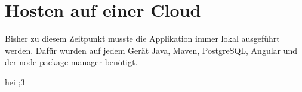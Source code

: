 \section{Hosten auf einer Cloud}

Bisher zu diesem Zeitpunkt musste die Applikation immer lokal ausgeführt werden. 
Dafür wurden auf jedem Gerät Java, Maven, PostgreSQL, Angular und der node package manager benötigt.


hei ;3